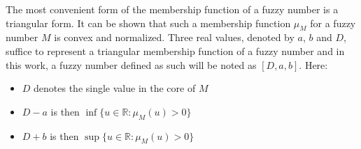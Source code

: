 
%  

The most convenient form of the membership function of a fuzzy number is a triangular form. It can be shown that such a membership function $\mu_M$ for a fuzzy number $M$ is convex and normalized. Three real values, denoted by $a$, $b$ and $D$, suffice to represent a triangular membership function of a fuzzy number and in this work, a fuzzy number defined as such will be noted as $\left[D, a, b \right]$. Here:
\begin{itemize}
\item
$D$ denotes the single value in the core of $M$
\item
$D-a$ is then $\inf \{u \in \mathbb{R} : \mu_{M}(u) > 0\}$
\item
$D+b$ is then $\sup \{u \in \mathbb{R} : \mu_{M}(u) > 0\}$
\end{itemize}

%
%

